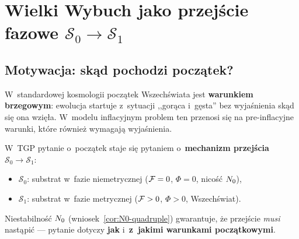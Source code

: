 \section{Wielki Wybuch jako przej\'scie fazowe $\mathcal{S}_0 \to \mathcal{S}_1$}%
\label{app:wielki-wybuch}

\subsection{Motywacja: sk\k{a}d pochodzi pocz\k{a}tek?}%
\label{app:G-motywacja}

W~standardowej kosmologii pocz\k{a}tek Wszech\'swiata jest
\textbf{warunkiem brzegowym}: ewolucja startuje z~sytuacji
,,gor\k{a}ca i~g\k{e}sta'' bez wyja\'snienia sk\k{a}d si\k{e}
ona wzi\k{e}\l{}a. W~modelu inflacyjnym problem ten przenosi si\k{e}
na pre-inflacyjne warunki, kt\'ore r\'ownie\.z wymagaj\k{a} wyja\'snienia.

W~TGP pytanie o~pocz\k{a}tek staje si\k{e} pytaniem o~\textbf{mechanizm
przej\'scia} $\mathcal{S}_0 \to \mathcal{S}_1$:
\begin{itemize}[nosep]
  \item $\mathcal{S}_0$: substrat w~fazie niemetrycznej
        ($\mathcal{F} = 0$, $\Phi = 0$, nico\'s\'c $N_0$),
  \item $\mathcal{S}_1$: substrat w~fazie metrycznej
        ($\mathcal{F} > 0$, $\Phi > 0$, Wszech\'swiat).
\end{itemize}

Niestabilno\'s\'c $N_0$ (wniosek~\ref{cor:N0-quadruple})
gwarantuje, \.ze przej\'scie \emph{musi} nast\k{a}pi\'c ---
pytanie dotyczy \textbf{jak} i~\textbf{z~jakimi warunkami
pocz\k{a}tkowymi}.

